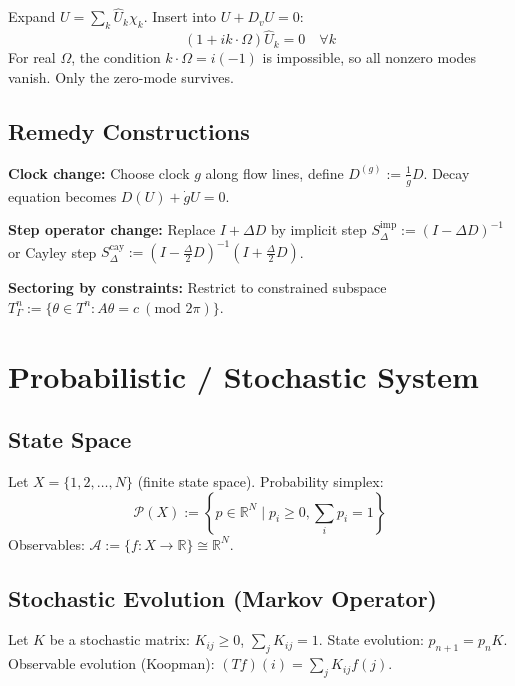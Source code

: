 \documentclass[12pt, oneside]{article}
\begin{document}
Expand $U = \sum_k \widehat{U}_k \chi_k$. Insert into $U + D_v U = 0$:
\begin{equation}
(1 + i k \cdot \Omega) \widehat{U}_k = 0 \quad \forall k
\end{equation}
For real $\Omega$, the condition $k \cdot \Omega = i(-1)$ is impossible, so all nonzero modes vanish. Only the zero-mode survives.

\subsection{Remedy Constructions}

\textbf{Clock change:} Choose clock $g$ along flow lines, define $D^{(g)} := \frac{1}{\dot{g}} D$. Decay equation becomes $D(U) + \dot{g} U = 0$.

\textbf{Step operator change:} Replace $I + \Delta D$ by implicit step $S_{\Delta}^{\text{imp}} := (I - \Delta D)^{-1}$ or Cayley step $S_{\Delta}^{\text{cay}} := (I - \frac{\Delta}{2} D)^{-1} (I + \frac{\Delta}{2} D)$.

\textbf{Sectoring by constraints:} Restrict to constrained subspace $T_\Gamma^n := \{\theta \in T^n : A\theta = c \ (\text{mod } 2\pi)\}$.

\section{Probabilistic / Stochastic System}

\subsection{State Space}

Let $X = \{1,2,\ldots,N\}$ (finite state space). Probability simplex:
\begin{equation}
\mathcal{P}(X) := \left\{ p \in \mathbb{R}^N \mid p_i \geq 0, \sum_i p_i = 1 \right\}
\end{equation}
Observables: $\mathcal{A} := \{ f: X \rightarrow \mathbb{R} \} \cong \mathbb{R}^N$.

\subsection{Stochastic Evolution (Markov Operator)}

Let $K$ be a stochastic matrix: $K_{ij} \geq 0$, $\sum_j K_{ij} = 1$. State evolution: $p_{n+1} = p_n K$. Observable evolution (Koopman): $(Tf)(i) = \sum_j K_{ij} f(j)$.
\end{document}
